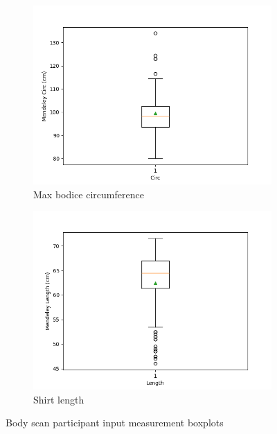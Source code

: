 \begin{figure}[H]
    \centering
    \begin{subfigure}[b]{0.45\textwidth}
        \centering
        \includegraphics[width=\textwidth]{Images/Mendeley_max_circ_Boxplot.png}
        \caption{Max bodice circumference}
        \label{fig:body_scan_max_circ}
    \end{subfigure}
    \hfill
    \begin{subfigure}[b]{0.45\textwidth}
        \centering
        \includegraphics[width=\textwidth]{Images/Mendeley_shirt_length_Boxplot.png}
        \caption{Shirt length}
        \label{fig:body_scan_shirt_length}
    \end{subfigure}
    \caption{Body scan participant input measurement boxplots}
\end{figure}

